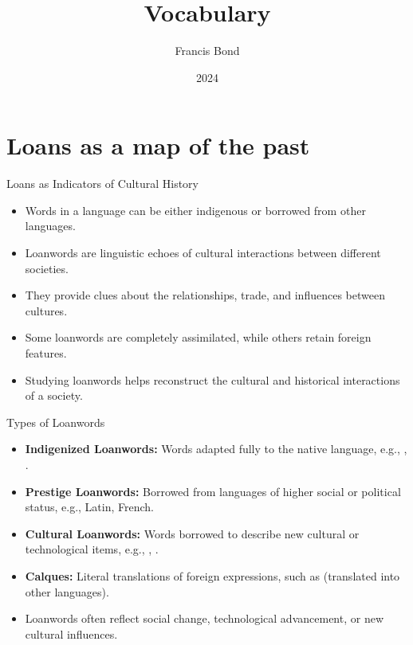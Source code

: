 \documentclass{beamer}
\title{Vocabulary}
\author[Francis Bond]{Francis Bond}
\date{2024}
\begin{document}
\frame{\titlepage}

\section{Loans as a map of the past}

\begin{frame}{Loans as Indicators of Cultural History}
    \begin{itemize}
        \item Words in a language can be either indigenous or borrowed from other languages.
        \item Loanwords are linguistic echoes of cultural interactions between different societies.
        \item They provide clues about the relationships, trade, and influences between cultures.
        \item Some loanwords are completely assimilated, while others retain foreign features.
        \item Studying loanwords helps reconstruct the cultural and historical interactions of a society.
    \end{itemize}
\end{frame}

\begin{frame}{Types of Loanwords}
    \begin{itemize}
        \item \textbf{Indigenized Loanwords:} Words adapted fully to the native language, e.g., , .
        \item \textbf{Prestige Loanwords:} Borrowed from languages of higher social or political status, e.g., Latin, French.
        \item \textbf{Cultural Loanwords:} Words borrowed to describe new cultural or technological items, e.g., , .
        \item \textbf{Calques:} Literal translations of foreign expressions, such as  (translated into other languages).
        \item Loanwords often reflect social change, technological advancement, or new cultural influences.
    \end{itemize}
\end{frame}
\end{document}
